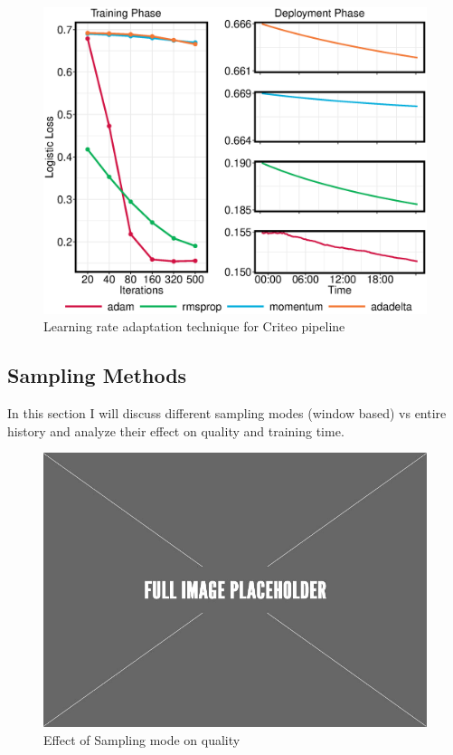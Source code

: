 \begin{figure}[h!]
\includegraphics[width=\columnwidth]{../images/experiment-results/learning-rate-experiment.eps}
\caption{Learning rate adaptation technique for Criteo pipeline}
\label{fig:criteo-learning-rate}
\end{figure}

\subsection{Sampling Methods}
In this section I will discuss different sampling modes (window based) vs entire history and analyze their effect on quality and training time. 

\begin{figure}[h!]
\centering
\includegraphics[width=\columnwidth]{../images/placeholder.jpeg}
\caption{Effect of Sampling mode on quality}
\label{fig:sampling-mode-quality}
\vspace{2mm}
\end{figure}

